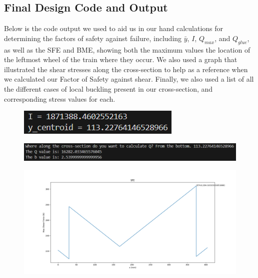 \documentclass[11pt]{article}
\begin{document}
\subsection{Final Design Code and Output}
Below is the code output we used to aid us in our hand calculations for determining the factors of safety against failure, including $\bar{y}$, $I$, $Q_{max}$, and $Q_{glue}$, as well as the SFE and BME, showing both the maximum values the location of the leftmost wheel of the train where they occur. We also used a graph that illustrated the shear stresses along the cross-section to help as a reference when we calculated our Factor of Safety against shear. Finally, we also used a list of all the different cases of local buckling present in our cross-section, and corresponding stress values for each.
\begin{figure}[H]
    \centering
    \includegraphics[scale = 0.7]{images/Code F 1.png}
\end{figure}

\begin{figure}[H]
    \centering
    \includegraphics[width=0.95\linewidth]{images/Code F 2.png}
\end{figure}

\begin{figure}[H]
    \centering
    \includegraphics[scale = 0.3]{images/SFE Final.png}
\end{figure}
\end{document}

